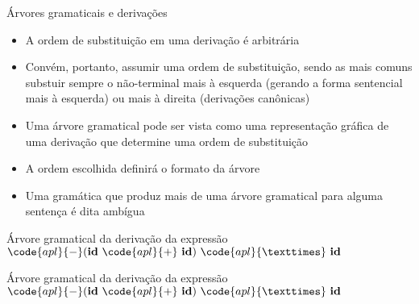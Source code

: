 \begin{frame}[fragile]{Árvores gramaticais e derivações}

    \begin{itemize}
        \item A ordem de substituição em uma derivação é arbitrária
        \pause

        \item Convém, portanto, assumir uma ordem de substituição, sendo as mais comuns substuir sempre o não-terminal mais à esquerda (gerando a forma sentencial
            mais à esquerda) ou mais à direita (derivações canônicas)
        \pause

        \item Uma árvore gramatical pode ser vista como uma representação gráfica de uma derivação que determine uma ordem de substituição
        \pause

        \item A ordem escolhida definirá o formato da árvore
        \pause

        \item Uma gramática que produz mais de uma árvore gramatical para alguma sentença é dita ambígua
    \end{itemize}

\end{frame}

\begin{frame}[fragile]{Árvore gramatical da derivação da expressão $\code{apl}{-}(\textbf{id}\ \code{apl}{+}\ \textbf{id})\ \code{apl}{×}\ \textbf{id}$}

    \begin{figure}
        \centering 

    \end{figure}

\end{frame}

\begin{frame}[fragile]{Árvore gramatical da derivação da expressão $\code{apl}{-}(\textbf{id}\ \code{apl}{+}\ \textbf{id})\ \code{apl}{×}\ \textbf{id}$}

    \begin{figure}
        \centering 

    \end{figure}

\end{frame}

